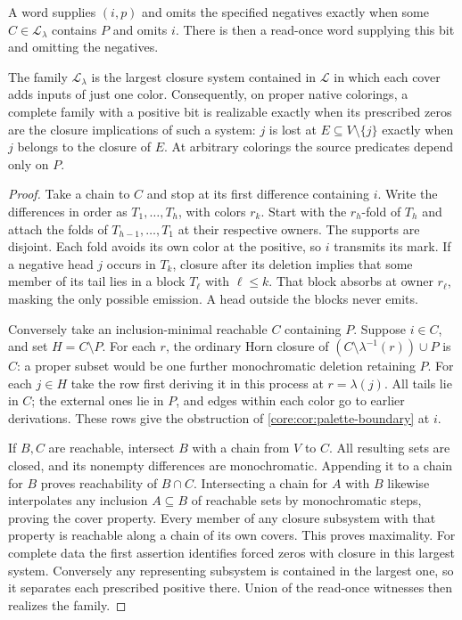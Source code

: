 \begin{theorem}
\label{core:thm:colored-closure-guards}
A word supplies $(i,p)$ and omits the specified negatives exactly
when some $C\in\mathcal L_\lambda$ contains $P$ and omits $i$.
There is then a read-once word supplying this bit and omitting the
negatives.

The family $\mathcal L_\lambda$ is the largest closure system contained
in $\mathcal L$ in which each cover adds inputs of just one color.
Consequently, on proper native colorings, a complete family with a
positive bit is realizable exactly when its prescribed zeros are the
closure implications of such a system: $j$ is lost at $E\subseteq
V\setminus\{j\}$ exactly when $j$ belongs to the closure of $E$.
At arbitrary colorings the source predicates depend only on $P$.
\end{theorem}
\begin{proof}
Take a chain to $C$ and stop at its first difference containing $i$.
Write the differences in order as $T_1,\ldots,T_h$, with colors $r_k$.
Start with the $r_h$-fold of $T_h$ and attach the folds of
$T_{h-1},\ldots,T_1$ at their respective owners. The supports are
disjoint. Each fold avoids its own color at the positive, so $i$
transmits its mark. If a negative head $j$ occurs in $T_k$, closure
after its deletion implies that some member of its tail lies in a
block $T_\ell$ with $\ell\le k$. That block absorbs at owner
$r_\ell$, masking the only possible emission. A head outside the
blocks never emits.

Conversely take an inclusion-minimal reachable $C$ containing $P$.
Suppose $i\in C$, and set $H=C\setminus P$. For each $r$, the ordinary
Horn closure of $(C\setminus\lambda^{-1}(r))\cup P$ is $C$: a
proper subset would be one further monochromatic deletion retaining
$P$. For each $j\in H$ take the row first deriving it in this process
at $r=\lambda(j)$. All tails lie in $C$; the external ones lie in
$P$, and edges within each color go to earlier derivations. These
rows give the obstruction of \cref{core:cor:palette-boundary} at $i$.

If $B,C$ are reachable, intersect $B$ with a chain from $V$ to $C$.
All resulting sets are closed, and its nonempty differences are
monochromatic. Appending it to a chain for $B$ proves reachability of
$B\cap C$. Intersecting a chain for $A$ with $B$ likewise interpolates
any inclusion $A\subseteq B$ of reachable sets by monochromatic
steps, proving the cover property. Every member of any closure
subsystem with that property is reachable along a chain of its own
covers. This proves maximality. For complete data the first assertion
identifies forced zeros with closure in this largest system. Conversely
any representing subsystem is contained in the largest one, so it
separates each prescribed positive there. Union of the read-once
witnesses then realizes the family.
\end{proof}

